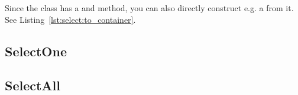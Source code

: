 Since the  class has a  and  method, you can also directly construct e.g. a  from it. See Listing~\ref{lst:select:to_container}.



\subsection{SelectOne}
\label{section:select:one}

\subsection{SelectAll}
\label{section:select:all}
